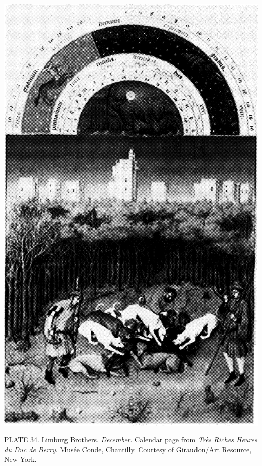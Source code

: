 \protect\hypertarget{20_ILLUSTRATIONS_FOLLOW_PAGE.xhtmlux5cux23id_30}{}{}\includegraphics{include/html/images/350_1.png}

PLATE 34. Limburg Brothers. \emph{December}. Calendar page from
\emph{Très Riches Heures du Duc de Berry}. Musée Conde, Chantilly.
Courtesy of Giraudon/Art Resource, New York.

